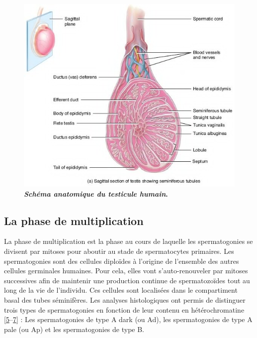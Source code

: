 \documentclass[12pt,a4paper,twoside]{ugathesis}
\theoremstyle{definition}
\theoremstyle{definition}
\theoremstyle{definition}
\theoremstyle{remark}
\begin{document}
\begin{figure}

{\centering \includegraphics[scale=0.65]{figure/coupe_testicule2} 

}

\caption[Schéma anatomique du testicule humain]{\textbf{\emph{Schéma anatomique du testicule humain}.}}\label{fig:testicule}
\end{figure}



\newpage

\subsection{La phase de
multiplication}\label{la-phase-de-multiplication}

La phase de multiplication est la phase au cours de laquelle les
spermatogonies se divisent par mitoses pour aboutir au stade de
spermatocytes primaires. Les spermatogonies sont des cellules diploïdes
à l'origine de l'ensemble des autres cellules germinales humaines. Pour
cela, elles vont s'auto-renouveler par mitoses successives afin de
maintenir une production continue de spermatozoïdes tout au long de la
vie de l'individu. Ces cellules sont localisées dans le compartiment
basal des tubes séminifères. Les analyses histologiques ont permis de
distinguer trois types de spermatogonies en fonction de leur contenu en
hétérochromatine
{[}\protect\hyperlink{ref-Clermont1963}{5}--\protect\hyperlink{ref-Goossens2013}{7}{]}
: Les spermatogonies de type A dark (ou Ad), les spermatogonies de type
A pale (ou Ap) et les spermatogonies de type B.
\end{document}
